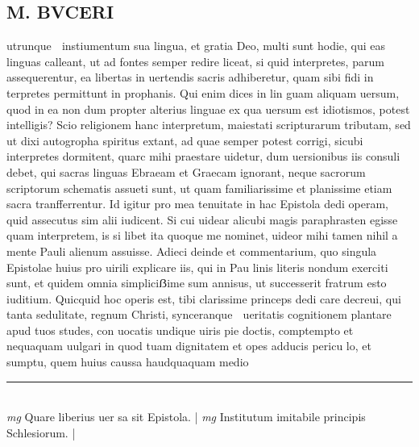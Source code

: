 \documentclass{article}
\begin{document}
\begin{pages}
\section*{M.  BVCERI }\pstart utrunque  instiumentum sua lingua, et gratia Deo, multi sunt hodie, qui eas linguas calleant, ut ad fontes semper redire liceat, si quid interpretes, parum assequerentur, ea libertas in uertendis sacris adhiberetur, quam sibi fidi in terpretes permittunt in prophanis. Qui enim dices in lin guam aliquam uersum, quod in ea non dum propter alterius linguae ex qua uersum est idiotismos, potest intelligis? Scio religionem hanc interpretum, maiestati scripturarum tributam, sed ut dixi autogropha spiritus extant, ad quae semper potest corrigi, sicubi interpretes dormitent, quarc mihi praestare uidetur, dum uersionibus iis consuli debet, qui sacras linguas Ebraeam et Graecam ignorant, neque  sacrorum scriptorum schematis assueti sunt, ut quam familiarissime et planissime etiam sacra tranfferrentur. Id igitur pro mea tenuitate in hac Epistola dedi operam, quid assecutus sim alii iudicent.  Si cui uidear alicubi magis paraphrasten egisse quam interpretem, is si libet ita quoque  me nominet, uideor mihi tamen nihil a mente Pauli alienum assuisse. Adieci deinde et commentarium, quo singula Epistolae huius pro uirili explicare iis, qui in Pau linis literis nondum exerciti sunt, et quidem omnia simpliciẞime sum annisus, ut successerit fratrum esto iuditium.   \pend\pstart Quicquid hoc operis est, tibi clarissime princeps dedi care decreui, qui tanta sedulitate, regnum Christi, synceranque  ueritatis cognitionem plantare apud tuos studes, con uocatis undique  uiris pie doctis, comptempto et nequaquam uulgari in quod tuam dignitatem et opes adducis pericu lo, et sumptu, quem huius caussa haudquaquam medio\pend
\vspace{0.5cm}\noindent
\vspace{0.2cm}\rule{1cm}{0.2pt}\\ 
\hspace{0.2cm}\textit{mg}
\footnotesize Quare liberius uer sa sit Epistola.  
\normalsize| 
\hspace{0.2cm}\textit{mg}
\footnotesize Institutum imitabile principis Schlesiorum.  
\normalsize| 

\end{pages}
\end{document}
